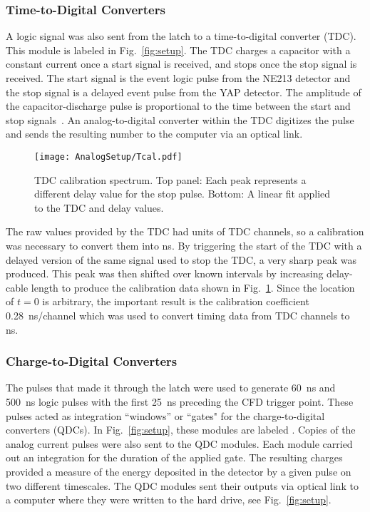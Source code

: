 \documentclass[main.tex]{subfiles}
\begin{document}
\subsubsection{Time-to-Digital Converters}
A logic signal was also sent from the latch to a time-to-digital converter (TDC). This module is labeled  in Fig.~\ref{fig:setup}. The TDC charges a capacitor with a constant current once a start signal is received, and stops once the stop signal is received. The start signal is the event logic pulse from the NE213 detector and the stop signal is a delayed event pulse from the YAP detector. The amplitude of the capacitor-discharge pulse is proportional to the time between the start and stop signals~\cite{CAENTDC}. An analog-to-digital converter within the TDC digitizes the pulse and sends the resulting number to the computer via an optical link.
\begin{figure}[h]
	\centering
    	\texttt{[image: AnalogSetup/Tcal.pdf]}
        \caption[TDC calibration spectrum.]{TDC calibration spectrum. Top panel: Each peak represents a different delay value for the stop pulse. Bottom: A linear fit applied to the TDC and delay values.}
	    \label{fig:Tcal} 
\end{figure}

The raw values provided by the TDC had units of TDC channels, so a calibration was necessary to convert them into ns. By triggering the start of the TDC with a delayed version of the same signal used to stop the TDC, a very sharp peak was produced. This peak was then shifted over known intervals by increasing delay-cable length to produce the calibration data shown in Fig.~\ref{fig:Tcal}. Since the location of $t=0$ is arbitrary, the important result is the calibration coefficient \SI{0.28}{\nano\second/channel} which was used to convert timing data from TDC channels to \si{ns}.

\subsubsection{Charge-to-Digital Converters}\label{sec:Ecal_A}
The pulses that made it through the latch were used to generate \SI{60}{\ns} and \SI{500}{\ns} logic pulses with the first \SI{25}{\ns} preceding the CFD trigger point. These pulses acted as integration ``windows'' or ``gates" for the charge-to-digital converters (QDCs). In Fig.~\ref{fig:setup}, these modules are labeled . Copies of the analog current pulses were also sent to the QDC modules. Each module carried out an integration for the duration of the applied gate. The resulting charges provided a measure of the energy deposited in the detector by a given pulse on two different timescales. The QDC modules sent their outputs via optical link to a computer where they were written to the hard drive, see Fig.~\ref{fig:setup}.
\end{document}
